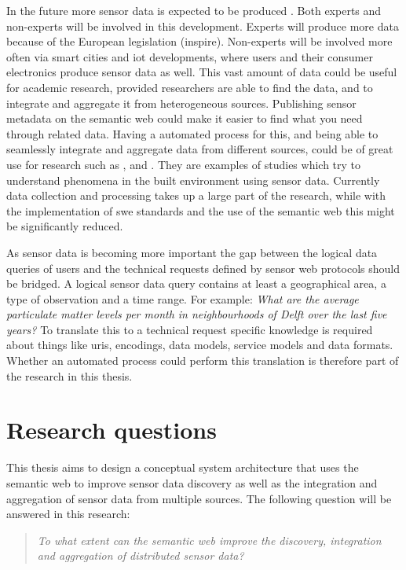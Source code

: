 In the future more sensor data is expected to be produced \citep{IoT:PWC}. Both experts and non-experts will be involved in this development. Experts will produce more data because of the European legislation (\ac{inspire}). Non-experts will be involved more often via smart cities and \ac{iot} developments, where users and their consumer electronics produce sensor data as well. This vast amount of data could be useful for academic research, provided researchers are able to find the data, and to integrate and aggregate it from heterogeneous sources. Publishing sensor metadata on the semantic web could make it easier to find what you need through related data. Having a automated process for this, and being able to seamlessly integrate and aggregate data from different sources, could be of great use for research such as \cite{UC:vanderHoeven}, \cite{UC:Hotterdam} and \cite{UC:Theunisse}. They are examples of studies which try to understand phenomena in the built environment using sensor data. Currently data collection and processing takes up a large part of the research, while with the implementation of \ac{swe} standards and the use of the semantic web this might be significantly reduced.  

As sensor data is becoming more important the gap between the logical data queries of users and the technical requests defined by sensor web protocols should be bridged. A logical sensor data query contains at least a geographical area, a type of observation and a time range. For example: \textit{What are the average particulate matter levels per month in neighbourhoods of Delft over the last five years?} To translate this to a technical request specific knowledge is required about things like \acp{uri}, encodings, data models, service models and data formats. Whether an automated process could perform this translation is therefore part of the research in this thesis. 


\section{Research questions}
This thesis aims to design a conceptual system architecture that uses the semantic web to improve sensor data discovery as well as the integration and aggregation of sensor data from multiple sources. The following question will be answered in this research:    

\begin{quote}
	\textit{To what extent can the semantic web improve the discovery, integration and aggregation of distributed sensor data?}
\end{quote}


